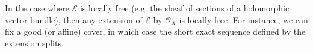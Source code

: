 %
In the case where $\mathcal{E}$ is locally free (e.g. the sheaf of sections
of a holomorphic vector bundle), then any extension of $\mathcal{E}$ by
$\mathcal{O}_X$ is locally free. For instance, we can fix a good (or affine) cover,
in which case the short exact sequence defined by the extension splits. 
%